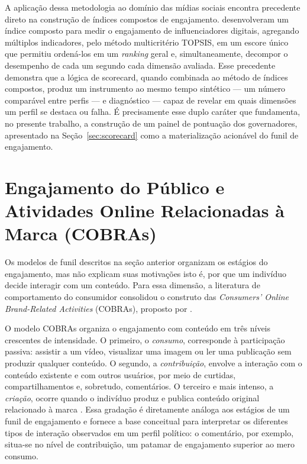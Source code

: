 A aplicação dessa metodologia ao domínio das mídias sociais encontra precedente direto na construção de índices compostos de engajamento.  desenvolveram um índice composto para medir o engajamento de influenciadores digitais, agregando múltiplos indicadores, pelo método multicritério TOPSIS, em um escore único que permitiu ordená-los em um \textit{ranking} geral e, simultaneamente, decompor o desempenho de cada um segundo cada dimensão avaliada. Esse precedente demonstra que a lógica de scorecard, quando combinada ao método de índices compostos, produz um instrumento ao mesmo tempo sintético --- um número comparável entre perfis --- e diagnóstico --- capaz de revelar em quais dimensões um perfil se destaca ou falha. É precisamente esse duplo caráter que fundamenta, no presente trabalho, a construção de um painel de pontuação dos governadores, apresentado na Seção~\ref{sec:scorecard} como a materialização acionável do funil de engajamento.

\section{Engajamento do Público e Atividades Online Relacionadas à Marca (COBRAs)}

Os modelos de funil descritos na seção anterior organizam os estágios do engajamento, mas não explicam suas motivações \textemdash{} isto é, por que um indivíduo decide interagir com um conteúdo. Para essa dimensão, a literatura de comportamento do consumidor consolidou o construto das \emph{Consumers' Online Brand-Related Activities} (COBRAs), proposto por .

O modelo COBRAs organiza o engajamento com conteúdo em três níveis crescentes de intensidade. O primeiro, o \emph{consumo}, corresponde à participação passiva: assistir a um vídeo, visualizar uma imagem ou ler uma publicação sem produzir qualquer conteúdo. O segundo, a \emph{contribuição}, envolve a interação com o conteúdo existente e com outros usuários, por meio de curtidas, compartilhamentos e, sobretudo, comentários. O terceiro e mais intenso, a \emph{criação}, ocorre quando o indivíduo produz e publica conteúdo original relacionado à marca \cite{muntinga2011}. Essa gradação é diretamente análoga aos estágios de um funil de engajamento e fornece a base conceitual para interpretar os diferentes tipos de interação observados em um perfil político: o comentário, por exemplo, situa-se no nível de contribuição, um patamar de engajamento superior ao mero consumo.

